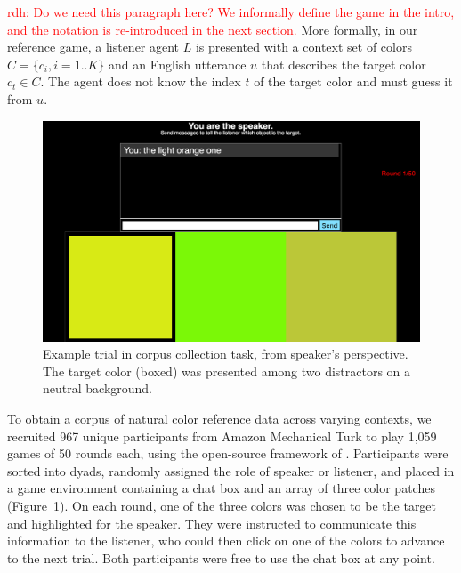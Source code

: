 \documentclass[11pt,letterpaper]{article}
\newcommand{\Listener}{L}
\newcommand{\utt}{u}
\newcommand{\referent}{c}
\newcommand{\context}{C}
\newcommand{\contextlen}{K}
\newcommand{\target}{t}
\renewcommand{\|}{\mid}
\newcommand{\figref}[1]{Figure~\ref{#1}}
\newcommand{\todocheck}[1]{\textcolor{red}{#1}}
\begin{document}
\todocheck{rdh: Do we need this paragraph here? We informally define the game in the intro, and the notation is re-introduced in the next section.}
More formally, in our reference game, a listener agent $\Listener$ is presented with a context set of colors
$\context = \{\referent_{i}, i=1..\contextlen\}$ and an English
utterance $\utt$ that describes the target color
$\referent_{\target} \in \context$. The agent does not know the index
$\target$ of the target color and must guess it from $\utt$.

\begin{figure}
\includegraphics[scale = .2]{figures/speakerView.png}
\caption{Example trial in corpus collection task, from speaker's
  perspective. The target color (boxed) was presented among two distractors on a neutral background.}
\label{fig:taskScreenshot}
\end{figure}
To obtain a corpus of natural color reference data across varying
contexts, we recruited 967 unique participants from Amazon
Mechanical Turk to play 1,059 games of 50 rounds each, using the open-source framework of
.  
Participants were sorted into dyads, randomly assigned the role of speaker or listener,
and placed in a game environment containing a chat box and an array of three color patches
(\figref{fig:taskScreenshot}). 
On each round, one of the three colors was chosen to be the target and
highlighted for the speaker. They were instructed to communicate this
information to the listener, who could then click on one of the colors
to advance to the next trial. Both participants were free to use the
chat box at any point.


\newcommand{\Lex}{\mathcal{L}}
\newcommand{\Costs}{\kappa}
\newcommand{\Messages}{U}
\newcommand{\targetPrior}{P}
\end{document}
